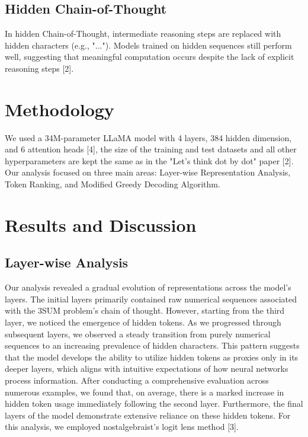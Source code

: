 \documentclass[10pt,a4paper]{article}
\begin{document}
\subsection{Hidden Chain-of-Thought}
In hidden Chain-of-Thought, intermediate reasoning steps are replaced with hidden characters (e.g., "..."). Models trained on hidden sequences still perform well, suggesting that meaningful computation occurs despite the lack of explicit reasoning steps [2].

\section{Methodology}
We used a 34M-parameter LLaMA model with 4 layers, 384 hidden dimension, and 6 attention heads [4], the size of the training and test datasets and all other hyperparameters are kept the same as in the "Let's think dot by dot" paper [2]. Our analysis focused on three main areas: Layer-wise Representation Analysis, Token Ranking, and Modified Greedy Decoding Algorithm.

\section{Results and Discussion}

\subsection{Layer-wise Analysis}
Our analysis revealed a gradual evolution of representations across the model's layers. The initial layers primarily contained raw numerical sequences associated with the 3SUM problem's chain of thought. However, starting from the third layer, we noticed the emergence of hidden tokens. As we progressed through subsequent layers, we observed a steady transition from purely numerical sequences to an increasing prevalence of hidden characters.
This pattern suggests that the model develops the ability to utilize hidden tokens as proxies only in its deeper layers, which aligns with intuitive expectations of how neural networks process information. After conducting a comprehensive evaluation across numerous examples, we found that, on average, there is a marked increase in hidden token usage immediately following the second layer. Furthermore, the final layers of the model demonstrate extensive reliance on these hidden tokens.
For this analysis, we employed nostalgebraist's logit lens method [3].
\end{document}

